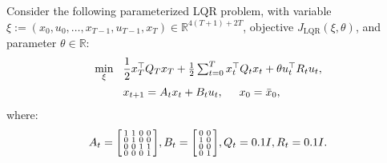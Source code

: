 \documentclass[letterpaper, 10 pt, conference]{ieeeconf}
\newcommand{\R}{\mathbb{R}}
\newcommand{\?}{\stackrel{?}{=}}
\newcommand{\objLQR}{J_{\mathrm{LQR}}}
\newcommand{\param}{\theta}
\newcommand{\paramSetLQR}{\Theta_{\mathrm{LQR}}}
\newcommand{\var}{\xi}
\newcommand{\LQRHorizon}{T}
\newcommand{\LQRIterate}{t}
\newcommand{\LQRStateCost}{Q}
\newcommand{\LQRControlCost}{R}
\newcommand{\LQRStateDyn}{A}
\newcommand{\LQRControlDyn}{B}
\newcommand{\antoine}[1]{{\textcolor[rgb]{1,0,0}{\textsf{[Antoine: {#1}]}}}}
\begin{document}
Consider the following parameterized LQR problem, with variable $\var := (x_0, u_0, \ldots, x_{\LQRHorizon-1}, u_{\LQRHorizon-1}, x_\LQRHorizon) \in \R^{4(T+1) + 2T}$, objective $\objLQR(\var, \param)$, and parameter $\param \in \R$:
{
\setlength{\abovedisplayskip}{3.5pt}
\setlength{\belowdisplayskip}{3.5pt}
\begin{subequations}
\label{eq:lqr}
\begin{align}
\label{eq:lqr_cost}
    \min_{\var} \hspace{3mm} &\frac{1}{2} \textstyle x_\LQRHorizon^\top \LQRStateCost_\LQRHorizon x_\LQRHorizon + \frac{1}{2} \sum_{\LQRIterate=0}^{\LQRHorizon} x_\LQRIterate^\top \LQRStateCost_\LQRIterate x_\LQRIterate + \param u_\LQRIterate^\top \LQRControlCost_\LQRIterate u_\LQRIterate, \\
\label{eq:lqr_dyn}
    &x_{\LQRIterate+1} = \LQRStateDyn_{\LQRIterate} x_{\LQRIterate} + \LQRControlDyn_{\LQRIterate} u_{\LQRIterate}, \hspace{5mm} x_0 = \bar{x}_0,
\end{align}
\end{subequations}
}
\hspace{-1mm}where:
\begin{equation}
    \LQRStateDyn_\LQRIterate = \begin{bsmallmatrix}
        1 & 1 & 0 & 0 \\
        0 & 1 & 0 & 0 \\
        0 & 0 & 1 & 1 \\
        0 & 0 & 0 & 1
    \end{bsmallmatrix}, 
    \LQRControlDyn_\LQRIterate = \begin{bsmallmatrix}
        0 & 0 \\
        1 & 0 \\
        0 & 0 \\
        0 & 1 
    \end{bsmallmatrix}, 
    \LQRStateCost_\LQRIterate = 0.1 I,
    \LQRControlCost_\LQRIterate = 0.1 I.
\end{equation}
\end{document}
